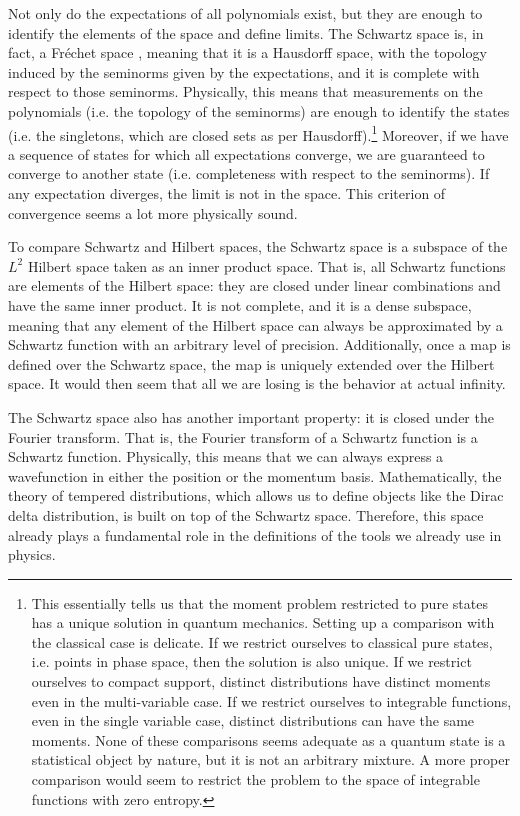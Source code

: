 \documentclass[10pt,twocolumn, nofootinbib]{revtex4-2}
\begin{document}
Not only do the expectations of all polynomials exist, but they are enough to identify the elements of the space and define limits. The Schwartz space is, in fact, a Fréchet space \cite[Theorem V.9]{reed_methods_1980}, meaning that it is a Hausdorff space, with the topology induced by the seminorms given by the expectations, and it is complete with respect to those seminorms. Physically, this means that measurements on the polynomials (i.e. the topology of the seminorms) are enough to identify the states (i.e. the singletons, which are closed sets as per Hausdorff).\footnote{This essentially tells us that the moment problem restricted to pure states has a unique solution in quantum mechanics. Setting up a comparison with the classical case is delicate. If we restrict ourselves to classical pure states, i.e. points in phase space, then the solution is also unique. If we restrict ourselves to compact support, distinct distributions have distinct moments even in the multi-variable case.\cite{moment_problem_2017} If we restrict ourselves to integrable functions, even in the single variable case, distinct distributions can have the same moments. None of these comparisons seems adequate as a quantum state is a statistical object by nature, but it is not an arbitrary mixture. A more proper comparison would seem to restrict the problem to the space of integrable functions with zero entropy.} Moreover, if we have a sequence of states for which all expectations converge, we are guaranteed to converge to another state (i.e. completeness with respect to the seminorms). If any expectation diverges, the limit is not in the space. This criterion of convergence seems a lot more physically sound.

To compare Schwartz and Hilbert spaces, the Schwartz space is a subspace of the $L^2$ Hilbert space taken as an inner product space. That is, all Schwartz functions are elements of the Hilbert space: they are closed under linear combinations and have the same inner product. It is not complete, and it is a dense subspace, meaning that any element of the Hilbert space can always be approximated by a Schwartz function with an arbitrary level of precision. Additionally, once a map is defined over the Schwartz space, the map is uniquely extended over the Hilbert space. It would then seem that all we are losing is the behavior at actual infinity.

The Schwartz space also has another important property: it is closed under the Fourier transform. That is, the Fourier transform of a Schwartz function is a Schwartz function. Physically, this means that we can always express a wavefunction in either the position or the momentum basis. Mathematically, the theory of tempered distributions, which allows us to define objects like the Dirac delta distribution, is built on top of the Schwartz space. Therefore, this space already plays a fundamental role in the definitions of the tools we already use in physics.
\end{document}
